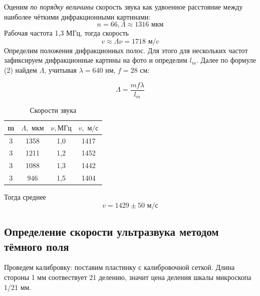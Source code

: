 \documentclass[a4paper, 12pt]{article}
\begin{document}
Оценим \emph{по порядку величины} скорость звука как удвоенное расстояние между наиболее чёткими дифракционными картинами:
\begin{equation*}
	n = 66, \Lambda \approx 1316 \text{ мкм}
\end{equation*}
Рабочая частота 1,3 МГц, тогда скорость
\begin{equation*}
	v \approx \Lambda \nu = 1718 \text{ м/c}
\end{equation*}
Определим положения дифракционных полос. Для этого для нескольких частот зафиксируем дифракционные картины на фото и определим $l_m$.
Далее по формуле (2) найдем $\Lambda$, учитывая $\lambda = 640 $ нм, $f = 28 $ см: 

\begin{equation}
	\Lambda = \frac{m f \lambda}{l_m}
\end{equation}

\begin{table}[H]
	\centering
	\begin{tabular}{|c|c|c|c|}
	\hline
	\textbf{m} & \textbf{$\Lambda, \text{ мкм}$} & \textbf{$\nu, \text{МГц}$} & \textbf{$v, \text{ м/с}$} \\ \hline
	3          & 1358                            & 1,0                        & 1417                      \\ \hline
	3          & 1211                            & 1,2                        & 1452                      \\ \hline
	3          & 1088                            & 1,3                        & 1442                      \\ \hline
	3          & 946                             & 1,5                        & 1404                      \\ \hline
	\end{tabular}
	\caption{Скорости звука}
	\label{tab:my-table}
\end{table}
Тогда среднее 
\begin{equation*}
	v = 1429 \pm 50 \text{ м/с}
\end{equation*}

\subsection*{Определение скорости ультразвука методом тёмного поля}

Проведем калибровку: поставим пластинку с калибровочной сеткой. Длина стороны 1 мм соотвествует 21 делению, значит цена деления шкалы микроскопа 1/21 мм.
\end{document}
